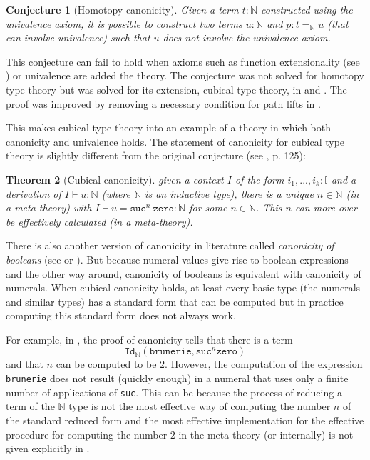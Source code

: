 \documentclass[12pt,a4paper,twoside,xetex]{book} %
\newcommand{\keyword}[1]{\emph{#1}\index{#1}}
\newtheorem{theorem}{Theorem}[section]
\newtheorem{conjecture}[theorem]{Conjecture}
\newcommand{\op}[1]{\mathtt{#1}}
\begin{document}
\begin{conjecture}[Homotopy canonicity]
Given a term $t: \mathbb{N}$ constructed using the univalence axiom, it is 
possible to 
construct two terms $u : \mathbb{N}$ and $p : t =_{\mathbb{N}} u$ (that can 
involve univalence) such that $u$ 
does not involve the univalence axiom.
\end{conjecture}

This conjecture can fail to hold when axioms such as function extensionality (see ) or 
univalence are added the theory. The conjecture was not solved for 
homotopy type theory but was solved for its extension, cubical type theory, in 
\cite{Huber2016} and \cite{Huber2017}. The proof was improved by 
removing a necessary condition for path lifts in
\cite{Coquand2019}.  

This makes cubical type theory into an example of a theory 
in which both canonicity and univalence holds. The statement of canonicity for 
cubical type theory is slightly different from the original conjecture (see 
\cite{Huber2016}, p. 125): 

\begin{theorem}[Cubical canonicity]\label{canonicity}
given a context $I$ of the form $i_1, ..., i_k : \mathbb{I}$ and a derivation 
of 
$I \vdash u : \mathbb{N}$ (where $\mathbb{N}$ is an inductive type), there is a 
unique $n \in \mathbb{N}$ (in a meta-theory) with $I \vdash u = \op{suc}^n \  
\op{zero} : \mathbb{N}$ for some $n \in \mathbb{N}$. This $n$ can more-over be 
effectively calculated (in a meta-theory). 
\end{theorem}

There is also another version of canonicity in literature called \keyword{canonicity of booleans} (see \cite{Angiuli2018} 
or \Cref{comptt}). But 
because numeral values give rise to boolean expressions and the other way 
around, canonicity of booleans is equivalent with canonicity of numerals. When 
cubical canonicity holds, at least every basic type (the numerals and similar 
types) has a standard form that can be computed but in practice computing 
this standard form does not always work.

For example, in , 
the proof of canonicity tells that there is a term 
$$\texttt{Id}_{\mathbb{N}}(\texttt{brunerie}, \texttt{suc}^n 
\texttt{zero})$$ and that  $n$ can be computed to be $2$. However, the 
computation of the expression \texttt{brunerie} does not result (quickly 
enough) in a numeral that uses only a finite number of applications of 
\texttt{suc}. This can be because the process of reducing a term of the 
$\mathbb{N}$ type is not the most effective way of computing the number $n$ of 
the standard reduced form and the most effective implementation for the effective procedure for computing the 
number $2$ in the meta-theory (or internally) is 
not given explicitly in \cite{Coquand2019}.
\end{document}
